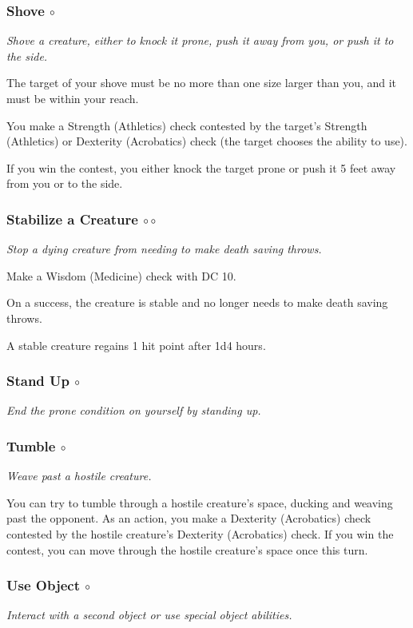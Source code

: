 \subsubsection{Shove $\circ$}
    \textit{Shove a creature, either to knock it prone, push it away from you, or push it to the side.}

    The target of your shove must be no more than one size larger than you, and it must be within your reach.

    You make a Strength (Athletics) check contested by the target's Strength (Athletics) or Dexterity (Acrobatics) check (the target chooses the ability to use).

    If you win the contest, you either knock the target prone or push it 5 feet away from you or to the side.

\subsubsection{Stabilize a Creature $\circ\circ$}
    \textit{Stop a dying creature from needing to make death saving throws.}

    Make a Wisdom (Medicine) check with DC 10.

    On a success, the creature is stable and no longer needs to make death saving throws.

    A stable creature regains 1 hit point after 1d4 hours.

\subsubsection{Stand Up $\circ$}
    \textit{End the prone condition on yourself by standing up.}
\subsubsection{Tumble $\circ$}
    \textit{Weave past a hostile creature.}

    You can try to tumble through a hostile creature's space, ducking and weaving past the opponent.
    As an action, you make a Dexterity (Acrobatics) check contested by the hostile creature's Dexterity (Acrobatics) check.
    If you win the contest, you can move through the hostile creature's space once this turn.

\subsubsection{Use Object $\circ$}
    \textit{Interact with a second object or use special object abilities.}

